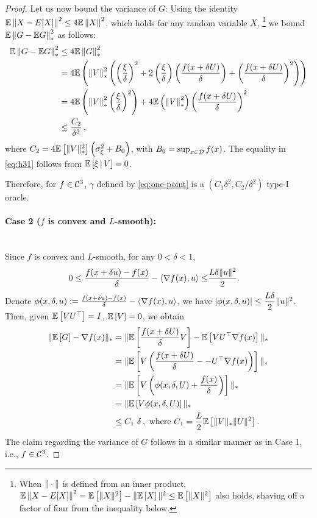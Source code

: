 \begin{proof}
Let us now bound the variance of $G$:
Using the identity $\mathbb{E}\left\|X -  E[X]\right\|^2 \le 4 \mathbb{E} \left\|X\right\|^2$, which holds for any random variable $X$,%
\footnote{When $\|\cdot\|$ is defined from an inner product,
$\mathbb{E}\left\|X -  E[X]\right\|^2 = \mathbb{E}\left[\|X\|^2\right] - \|\mathbb{E}\left[X\right]\|^2 \le \mathbb{E}\left[\|X\|^2\right]$ also holds, shaving off a factor of four from the inequality below.}
we bound $\mathbb{E}\left\| G - \mathbb{E} G\right\|_*^2$ as follows:
\begin{align}
\mathbb{E}\left\| G - \mathbb{E} G\right\|_*^2
 &\le 4 \mathbb{E} \left\|G\right\|_*^2 \nonumber \\
& =  4\mathbb{E}\left( \left\| V \right\|_*^2 \left(\left(\dfrac{\xi}{\delta}\right)^2  + 2 \left(\dfrac{\xi}{\delta}\right) \left(\dfrac{f(x+\delta U)}{\delta}\right)
+ \left( \dfrac{f(x+\delta U) }{\delta} \right)^2 \right)\right) \nonumber \\
&=  4\mathbb{E}\left( \left\| V \right\|_*^2 \left(\dfrac{\xi}{\delta}\right)^2\right)
+ 4 \mathbb{E} \left(\left\| V \right\|_*^2 \right)\left( \dfrac{f(x+\delta U) }{\delta} \right)^2  \label{eq:h31} \\
& \le  \frac{C_2}{\delta^2}\,, \nonumber \label{eq:h41}
\end{align}
where $C_2 = 4 \mathbb{E}\left[\|V\|_*^2\right]\left( \sigma_\xi^2+B_0\right)$, with $B_0 = \sup_{x\in \mathcal{D}} f(x)$.
The equality in \eqref{eq:h31} follows from $\mathbb{E}\left[ \xi \,|\, V \right] = 0$.

Therefore, for $f \in \mathcal{C}^3$, $\gamma$ defined by \eqref{eq:one-point} is a $(C_1\delta^2, C_2/\delta^2)$ type-I oracle.

\paragraph{Case 2 ($f$ is convex and $L$-smooth):}\ \\
Since $f$ is convex and $L$-smooth, for any $0<\delta <1$,
\begin{align*}
 0 \le \frac{f(x + \delta u)-f(x)}{\delta}-\left\langle\nabla f(x), u\right\rangle \le&   \frac{L \delta \| u\|^2}{2}.
\end{align*}
Denote
$\phi(x,\delta,u):=\frac{f(x + \delta u)-f(x)}{\delta}-\left\langle\nabla f(x), u\right\rangle$, we have
$\left|\phi(x,\delta,u) \right| \le  \dfrac{L\delta}{2} \|u\|^2$.
Then,  given $\mathbb{E}\left[VU^\top\right]=I$, $\mathbb{E}\left[V\right]=0$, we obtain
\begin{align}
\| \mathbb{E}\left[ G \right] - \nabla f(x) \|_*
&= \| \mathbb{E}\left[\frac{f(x + \delta U)}{\delta}V\right]-\mathbb{E}\left[VU^\top \nabla f(x)\right]  \|_*\nonumber\\
&=\| \mathbb{E}\left[V\left( \frac{f(x + \delta U)}{\delta}- -U^\top \nabla f(x)\right)\right]  \|_*\nonumber\\
&= \| \mathbb{E}\left[V\left( \phi(x,\delta,U)+\dfrac{f(x)}{\delta} \right)\right]  \|_*\nonumber\\
&=\| \mathbb{E}\left[V\phi(x,\delta,U)\right] \|_*\nonumber\\
&\le C_1 \,\, \delta\,, \text{ where } C_1 = \dfrac{L}{2}\mathbb{E}\left[\|V\|_*\|U\|^2\right]. \label{eq:c1onepoint}
\end{align}
The claim regarding the variance of $G$ follows in a similar manner as in Case 1, i.e., $f \in \mathcal{C}^3$.


\end{proof}
